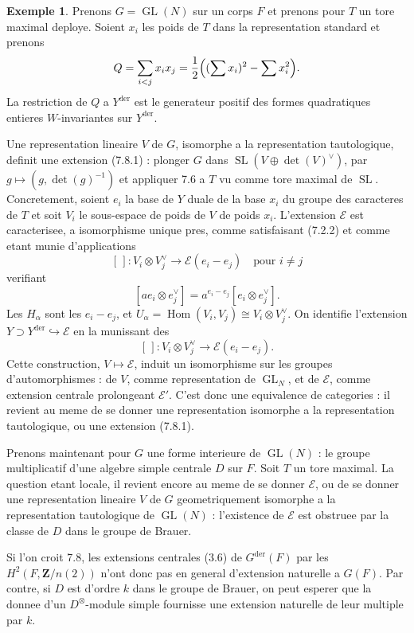 \documentclass[11pt,a4paper]{article}
\theoremstyle{plain}
\theoremstyle{definition}
\newtheorem{example}[theorem]{Exemple}
\DeclareMathOperator{\Hom}{Hom}
\DeclareMathOperator{\SL}{SL}
\DeclareMathOperator{\GL}{GL}
\DeclareMathOperator{\der}{der}
\begin{document}
\begin{example}\label{7.10}
Prenons $G = \GL(N)$ sur un corps $F$ et prenons pour $T$ un tore maximal deploye. Soient $x_i$ les poids de $T$ dans la representation standard et prenons
\[
Q = \sum_{i < j} x_i x_j = \frac{1}{2}\Bigl((\sum x_i)^2 - \sum x_i^2\Bigr).
\]
La restriction de $Q$ a $Y^{\der}$ est le generateur positif des formes quadratiques entieres $W$-invariantes sur $Y^{\der}$.

Une representation lineaire $V$ de $G$, isomorphe a la representation tautologique, definit une extension (7.8.1) : plonger $G$ dans $\SL(V \oplus \det(V)^\vee)$, par $g \mapsto (g, \det(g)^{-1})$ et appliquer 7.6 a $T$ vu comme tore maximal de $\SL$. Concretement, soient $e_i$ la base de $Y$ duale de la base $x_i$ du groupe des caracteres de $T$ et soit $V_i$ le sous-espace de poids de $V$ de poids $x_i$. L'extension $\mathscr{E}$ est caracterisee, a isomorphisme unique pres, comme satisfaisant (7.2.2) et comme etant munie d'applications
\[
[\,] : V_i \otimes V_j^\vee \to \mathscr{E}(e_i - e_j) \quad \text{pour } i \neq j
\]
verifiant
\[
[ae_i \otimes e_j^\vee] = a^{e_i - e_j} [e_i \otimes e_j^\vee].
\]
Les $H_\alpha$ sont les $e_i - e_j$, et $U_\alpha = \Hom(V_i, V_j) \cong V_i \otimes V_j^\vee$. On identifie l'extension $Y \supset Y^{\der} \hookrightarrow \mathscr{E}$ en la munissant des
\[
[\,] : V_i \otimes V_j^\vee \to \mathscr{E}(e_i - e_j).
\]
Cette construction, $V \mapsto \mathscr{E}$, induit un isomorphisme sur les groupes d'automorphismes : de $V$, comme representation de $\GL_N$, et de $\mathscr{E}$, comme extension centrale prolongeant $\mathscr{E}'$. C'est donc une equivalence de categories : il revient au meme de se donner une representation isomorphe a la representation tautologique, ou une extension (7.8.1).

Prenons maintenant pour $G$ une forme interieure de $\GL(N)$ : le groupe multiplicatif d'une algebre simple centrale $D$ sur $F$. Soit $T$ un tore maximal. La question etant locale, il revient encore au meme de se donner $\mathscr{E}$, ou de se donner une representation lineaire $V$ de $G$ geometriquement isomorphe a la representation tautologique de $\GL(N)$ : l'existence de $\mathscr{E}$ est obstruee par la classe de $D$ dans le groupe de Brauer.

Si l'on croit 7.8, les extensions centrales (3.6) de $G^{\der}(F)$ par les $H^2(F, \mathbf{Z}/n(2))$ n'ont donc pas en general d'extension naturelle a $G(F)$. Par contre, si $D$ est d'ordre $k$ dans le groupe de Brauer, on peut esperer que la donnee d'un $D^\otimes$-module simple fournisse une extension naturelle de leur multiple par $k$.
\end{example}
\end{document}
